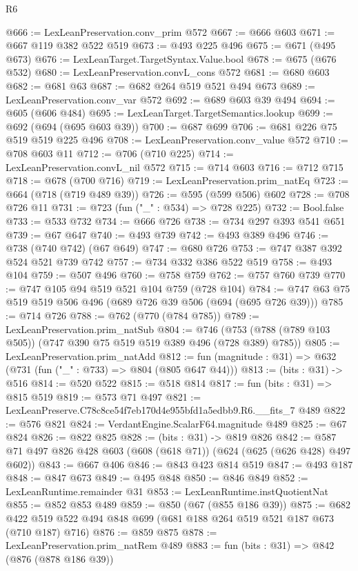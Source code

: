 \begin{lexlean}{R6}
\begin{coremodule}
@666 := LexLeanPreservation.conv_prim @572
@667 := @666 @603
@671 := @667 @119 @382 @522 @519
@673 := @493 @225 @496
@675 := @671 (@495 @673)
@676 := LexLeanTarget.TargetSyntax.Value.bool
@678 := @675 (@676 @532)
@680 := LexLeanPreservation.convL_cons @572
@681 := @680 @603
@682 := @681 @63
@687 := @682 @264 @519 @521 @494 @673
@689 := LexLeanPreservation.conv_var @572
@692 := @689 @603 @39 @494
@694 := @605 (@606 @484)
@695 := LexLeanTarget.TargetSemantics.lookup
@699 := @692 (@694 (@695 @603 @39))
@700 := @687 @699
@706 := @681 @226 @75 @519 @519 @225 @496
@708 := LexLeanPreservation.conv_value @572
@710 := @708 @603 @11
@712 := @706 (@710 @225)
@714 := LexLeanPreservation.convL_nil @572
@715 := @714 @603
@716 := @712 @715
@718 := @678 (@700 @716)
@719 := LexLeanPreservation.prim_natEq
@723 := @664 (@718 (@719 @489 @39))
@726 := @595 (@599 @506) @602
@728 := @708 @726 @11
@731 := @723 (fun ("_" : @534) => @728 @225)
@732 := Bool.false
@733 := @533 @732
@734 := @666 @726
@738 := @734 @297 @393 @541 @651
@739 := @67 @647
@740 := @493 @739
@742 := @493 @389 @496
@746 := @738 (@740 @742) (@67 @649)
@747 := @680 @726
@753 := @747 @387 @392 @524 @521 @739 @742
@757 := @734 @332 @386 @522 @519
@758 := @493 @104
@759 := @507 @496
@760 := @758 @759
@762 := @757 @760 @739
@770 := @747 @105 @94 @519 @521 @104 @759 (@728 @104)
@784 := @747 @63 @75 @519 @519 @506 @496 (@689 @726 @39 @506 (@694 (@695 @726 @39)))
@785 := @714 @726
@788 := @762 (@770 (@784 @785))
@789 := LexLeanPreservation.prim_natSub
@804 := @746 (@753 (@788 (@789 @103 @505)) (@747 @390 @75 @519 @519 @389 @496 (@728 @389) @785))
@805 := LexLeanPreservation.prim_natAdd
@812 := fun (magnitude : @31) => @632 (@731 (fun ("_" : @733) => @804 (@805 @647 @44)))
@813 := (bits : @31) -> @516
@814 := @520 @522
@815 := @518 @814
@817 := fun (bits : @31) => @815 @519
@819 := @573 @71 @497
@821 := LexLeanPreserve.C78c8ce54f7eb170d4e955bfd1a5edbb9.R6.__fits_7 @489
@822 := @576 @821
@824 := VerdantEngine.ScalarF64.magnitude @489
@825 := @67 @824
@826 := @822 @825
@828 := (bits : @31) -> @819 @826
@842 := @587 @71 @497 @826 @428 @603 (@608 (@618 @71)) (@624 (@625 (@626 @428) @497 @602))
@843 := @667 @406
@846 := @843 @423 @814 @519
@847 := @493 @187
@848 := @847 @673
@849 := @495 @848
@850 := @846 @849
@852 := LexLeanRuntime.remainder @31
@853 := LexLeanRuntime.instQuotientNat
@855 := @852 @853 @489
@859 := @850 (@67 (@855 @186 @39))
@875 := @682 @422 @519 @522 @494 @848 @699 (@681 @188 @264 @519 @521 @187 @673 (@710 @187) @716)
@876 := @859 @875
@878 := LexLeanPreservation.prim_natRem @489
@883 := fun (bits : @31) => @842 (@876 (@878 @186 @39))

\end{coremodule}
\end{lexlean}
